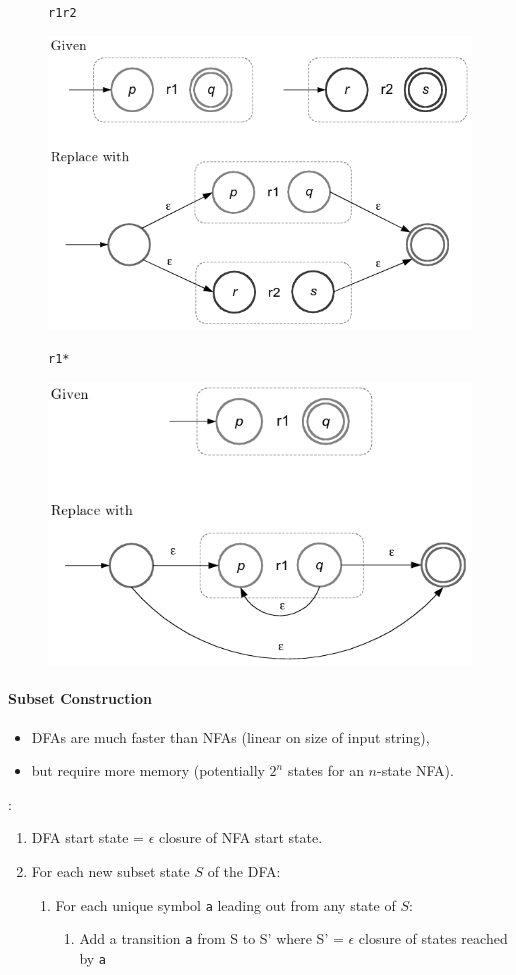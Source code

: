 \documentclass[twocolumn,english]{article}
\let\emph\relax
\begin{document}
\begin{figure}[H]
\begin{centering}
\texttt{r1\textbar{}r2} 
\par\end{centering}
\centering{}\includegraphics[width=0.5\linewidth]{img/alternate} 
\end{figure}

\begin{figure}[H]
\begin{centering}
\texttt{r1{*}} 
\par\end{centering}
\centering{}\includegraphics[width=0.5\linewidth]{img/repeat} 
\end{figure}

\paragraph{Subset Construction}
\begin{itemize}
\item DFAs are much faster than NFAs (linear on size of input string), 
\item but require more memory (potentially $2^{n}$ states for an $n$-state
NFA). 
\end{itemize}
\emph{Algorithm}: 
\begin{enumerate}
\item DFA start state = $\epsilon$ closure of NFA start state. 
\item For each new subset state $S$ of the DFA:
\begin{enumerate}
\item For each unique symbol \texttt{a} leading out from any state of $S$:
\begin{enumerate}
\item Add a transition \texttt{a} from S to S' where S' = $\epsilon$ closure
of states reached by \texttt{a} 
\end{enumerate}
\end{enumerate}
\end{enumerate}
\end{document}
